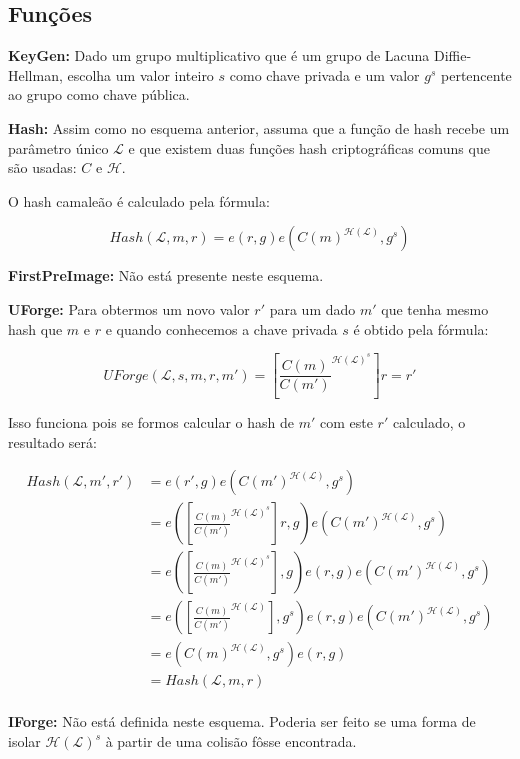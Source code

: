 \documentclass[a4paper]{article}
\begin{document}
\subsection{Funções}

\textbf{KeyGen: }Dado um grupo multiplicativo que é um grupo de Lacuna
Diffie-Hellman, escolha um valor inteiro $s$ como chave privada e um
valor $g^s$ pertencente ao grupo como chave pública.

\textbf{Hash: } Assim como no esquema anterior, assuma que a função de
hash recebe um parâmetro único $\mathcal{L}$ e que existem duas
funções hash criptográficas comuns que são usadas: $C$ e
$\mathcal{H}$.

O hash camaleão é calculado  pela fórmula:

$$
Hash(\mathcal{L}, m, r) = e(r, g)e(C(m)^{\mathcal{H}(\mathcal{L})}, g^s)
$$

\textbf{FirstPreImage:} Não está presente neste esquema.

\textbf{UForge:} Para obtermos um novo valor $r'$ para um dado $m'$
que tenha mesmo hash que $m$ e $r$ e quando conhecemos a chave privada
$s$ é obtido pela fórmula:

$$
UForge(\mathcal{L}, s, m, r, m') = \left[\frac{C(m)}{C(m')}^{\mathcal{H}(\mathcal{L})^s}\right]r = r'
$$

Isso funciona pois se formos calcular o hash de $m'$ com este $r'$
calculado, o resultado será:

\begin{equation}
\begin{split}
  Hash(\mathcal{L}, m', r') &= e(r', g)e(C(m')^{\mathcal{H}(\mathcal{L})}, g^s)\\
  &= e(\left[\frac{C(m)}{C(m')}^{\mathcal{H}(\mathcal{L})^s}\right]r, g)e(C(m')^{\mathcal{H}(\mathcal{L})}, g^s)\\
  &=e(\left[\frac{C(m)}{C(m')}^{\mathcal{H}(\mathcal{L})^s}\right], g)e(r, g)e(C(m')^{\mathcal{H}(\mathcal{L})}, g^s)\\
  &=e(\left[\frac{C(m)}{C(m')}^{\mathcal{H}(\mathcal{L})}\right], g^s)e(r, g)e(C(m')^{\mathcal{H}(\mathcal{L})}, g^s)\\
  &=e(C(m)^{\mathcal{H}(\mathcal{L})}, g^s)e(r, g)\\
  &= Hash(\mathcal{L}, m, r)\\
\end{split}
\end{equation}

\textbf{IForge:} Não está definida neste esquema. Poderia ser feito se
uma forma de isolar $\mathcal{H}(\mathcal{L})^s$ à partir de uma
colisão fôsse encontrada.
\end{document}
